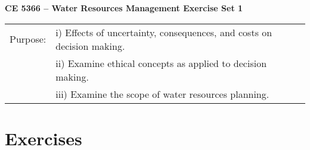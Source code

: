 \documentclass[12pt]{article}
\begin{document}
\begin{center}
{\textbf{{ CE 5366 -- Water Resources Management}  {Exercise Set 1}}}
\end{center}
\begingroup
\begin{tabular}{p{1in} p{5in}}
Purpose: & i) Effects of uncertainty, consequences, and costs on decision making. \\
~ & ii) Examine ethical concepts as applied to decision making.\\
~ & iii) Examine the scope of water resources planning. \\
\end{tabular}
\endgroup
\section*{\small{Exercises}}
\end{document}
